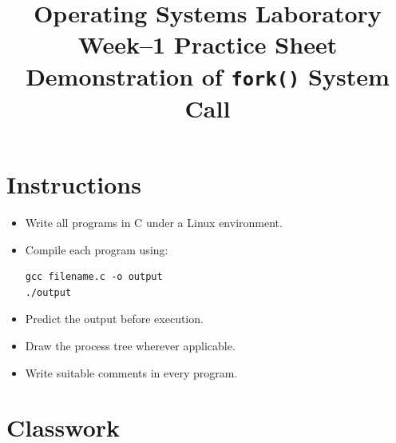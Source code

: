 \documentclass[12pt,a4paper]{article}
\title{\textbf{Operating Systems Laboratory}\\
Week--1 Practice Sheet\\
\Large Demonstration of \texttt{fork()} System Call}
\author{}
\date{}
\begin{document}
\maketitle

\section*{Instructions}

\begin{itemize}
    \item Write all programs in C under a Linux environment.
    \item Compile each program using:
\begin{lstlisting}
gcc filename.c -o output
./output
\end{lstlisting}
    \item Predict the output before execution.
    \item Draw the process tree wherever applicable.
    \item Write suitable comments in every program.
\end{itemize}


\section*{Classwork}
\end{document}
